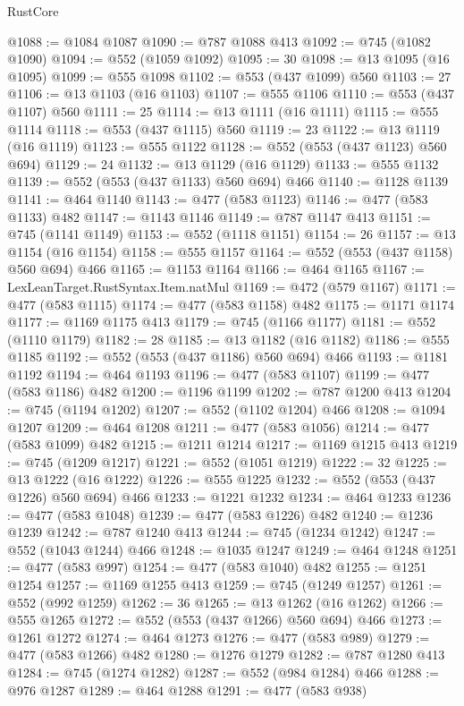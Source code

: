 \begin{lexlean}{RustCore}
\begin{coremodule}
@1088 := @1084 @1087
@1090 := @787 @1088 @413
@1092 := @745 (@1082 @1090)
@1094 := @552 (@1059 @1092)
@1095 := 30
@1098 := @13 @1095 (@16 @1095)
@1099 := @555 @1098
@1102 := @553 (@437 @1099) @560
@1103 := 27
@1106 := @13 @1103 (@16 @1103)
@1107 := @555 @1106
@1110 := @553 (@437 @1107) @560
@1111 := 25
@1114 := @13 @1111 (@16 @1111)
@1115 := @555 @1114
@1118 := @553 (@437 @1115) @560
@1119 := 23
@1122 := @13 @1119 (@16 @1119)
@1123 := @555 @1122
@1128 := @552 (@553 (@437 @1123) @560 @694)
@1129 := 24
@1132 := @13 @1129 (@16 @1129)
@1133 := @555 @1132
@1139 := @552 (@553 (@437 @1133) @560 @694) @466
@1140 := @1128 @1139
@1141 := @464 @1140
@1143 := @477 (@583 @1123)
@1146 := @477 (@583 @1133) @482
@1147 := @1143 @1146
@1149 := @787 @1147 @413
@1151 := @745 (@1141 @1149)
@1153 := @552 (@1118 @1151)
@1154 := 26
@1157 := @13 @1154 (@16 @1154)
@1158 := @555 @1157
@1164 := @552 (@553 (@437 @1158) @560 @694) @466
@1165 := @1153 @1164
@1166 := @464 @1165
@1167 := LexLeanTarget.RustSyntax.Item.natMul
@1169 := @472 (@579 @1167)
@1171 := @477 (@583 @1115)
@1174 := @477 (@583 @1158) @482
@1175 := @1171 @1174
@1177 := @1169 @1175 @413
@1179 := @745 (@1166 @1177)
@1181 := @552 (@1110 @1179)
@1182 := 28
@1185 := @13 @1182 (@16 @1182)
@1186 := @555 @1185
@1192 := @552 (@553 (@437 @1186) @560 @694) @466
@1193 := @1181 @1192
@1194 := @464 @1193
@1196 := @477 (@583 @1107)
@1199 := @477 (@583 @1186) @482
@1200 := @1196 @1199
@1202 := @787 @1200 @413
@1204 := @745 (@1194 @1202)
@1207 := @552 (@1102 @1204) @466
@1208 := @1094 @1207
@1209 := @464 @1208
@1211 := @477 (@583 @1056)
@1214 := @477 (@583 @1099) @482
@1215 := @1211 @1214
@1217 := @1169 @1215 @413
@1219 := @745 (@1209 @1217)
@1221 := @552 (@1051 @1219)
@1222 := 32
@1225 := @13 @1222 (@16 @1222)
@1226 := @555 @1225
@1232 := @552 (@553 (@437 @1226) @560 @694) @466
@1233 := @1221 @1232
@1234 := @464 @1233
@1236 := @477 (@583 @1048)
@1239 := @477 (@583 @1226) @482
@1240 := @1236 @1239
@1242 := @787 @1240 @413
@1244 := @745 (@1234 @1242)
@1247 := @552 (@1043 @1244) @466
@1248 := @1035 @1247
@1249 := @464 @1248
@1251 := @477 (@583 @997)
@1254 := @477 (@583 @1040) @482
@1255 := @1251 @1254
@1257 := @1169 @1255 @413
@1259 := @745 (@1249 @1257)
@1261 := @552 (@992 @1259)
@1262 := 36
@1265 := @13 @1262 (@16 @1262)
@1266 := @555 @1265
@1272 := @552 (@553 (@437 @1266) @560 @694) @466
@1273 := @1261 @1272
@1274 := @464 @1273
@1276 := @477 (@583 @989)
@1279 := @477 (@583 @1266) @482
@1280 := @1276 @1279
@1282 := @787 @1280 @413
@1284 := @745 (@1274 @1282)
@1287 := @552 (@984 @1284) @466
@1288 := @976 @1287
@1289 := @464 @1288
@1291 := @477 (@583 @938)

\end{coremodule}
\end{lexlean}
